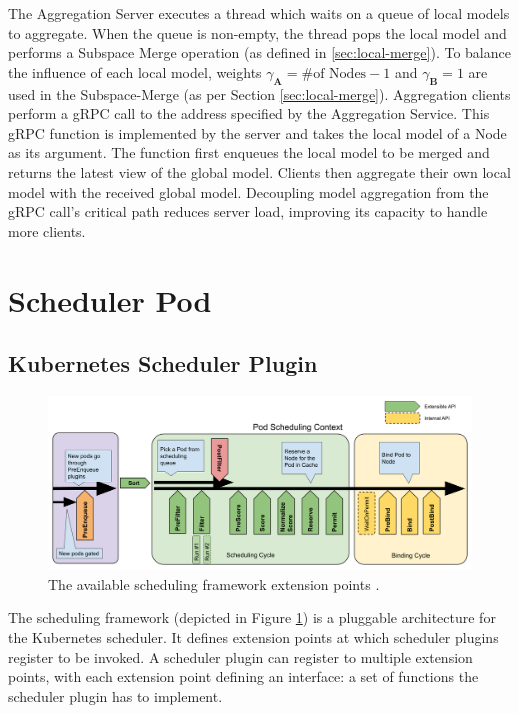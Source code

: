 The Aggregation Server executes a thread which waits on a queue of local models
to aggregate. When the queue is non-empty, the thread pops the local model and
performs a Subspace Merge operation (as defined in \ref{sec:local-merge}). To
balance the influence of each local model, weights $\gamma_{\mathbf{A}} =
\text{\# of Nodes} - 1$ and $\gamma_{\mathbf{B}} = 1$ are used in the
Subspace-Merge (as per Section \ref{sec:local-merge}).
Aggregation clients perform a gRPC call to the address specified by the
Aggregation Service. This gRPC function is implemented by the server and takes
the local model of a Node as its argument. The function first enqueues the local
model to be merged and returns the latest view of the global model. Clients
then aggregate their own local model with the received global model. Decoupling
model aggregation from the gRPC call's critical path reduces server load,
improving its capacity to handle more clients.

\section{Scheduler Pod}
\subsection{Kubernetes Scheduler Plugin}
\begin{figure}[H]
    \centering
    \includegraphics[width=\textwidth]{images/scheduling-framework-extensions.png}
    \caption{The available scheduling framework extension points
    \cite{scheduling-framework}.}
    \label{fig:kube-sched-framework}
\end{figure}
The scheduling framework (depicted in Figure \ref{fig:kube-sched-framework}) is
a pluggable architecture for the Kubernetes scheduler. It defines extension
points at which scheduler plugins register to be invoked. A scheduler plugin can
register to multiple extension points, with each extension point defining an
interface: a set of functions the scheduler plugin has to implement.

